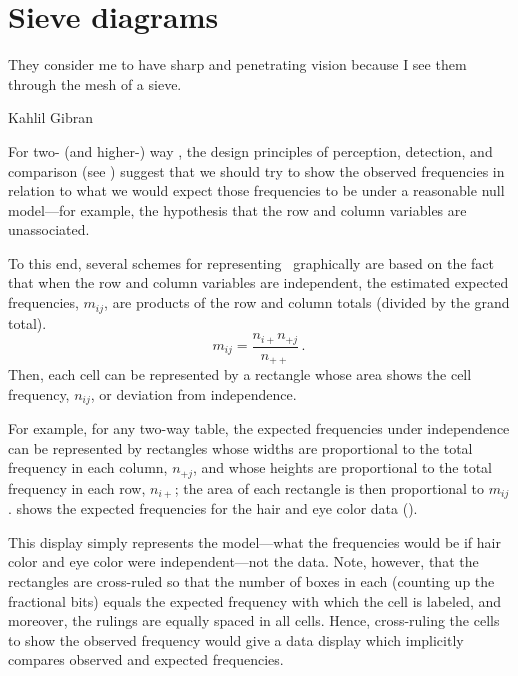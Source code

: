 \section{Sieve diagrams}\label{sec:twoway-sieve}
\epigraph{They consider me to have sharp and penetrating vision because I see
them through the mesh of a sieve.}{Kahlil Gibran}
For two- (and higher-) way \ctabs{}, the
design principles of perception, detection, and comparison
(see )
suggest that we should try to show the observed frequencies
in relation to what we would expect those frequencies to be
under a reasonable null model---for example, the
hypothesis that the row and column variables are unassociated.

To this end, several schemes for representing \ctabs\
graphically are
based on the fact that when the row and column variables are
independent, the estimated expected frequencies, \(m_{ij}\), are
products of the row and column totals (divided by the grand total).
\begin{equation*}
 m_{ij} = \frac{ n_{i+} n_{+j} } { n_{++} }
 \period
\end{equation*}
Then, each cell can be represented by a rectangle whose area shows
the cell frequency, \(n_{ij}\),  or deviation from independence.

For example, for any two-way table, the expected frequencies under independence
can be represented by rectangles whose widths are proportional to the
total frequency in each column, \(n_{+j}\), and whose heights are
proportional to the total frequency in each row, \(n_{i+}\); the area
of each rectangle is then proportional to \(m_{ij}\). 
shows the expected frequencies for the hair and eye color
data ().

This display simply represents the model---what the frequencies would
be if hair color and eye color were independent---not the data.
Note, however, that the rectangles are cross-ruled so that the number of
boxes in each (counting up the fractional bits) equals the expected
frequency with which the cell is labeled, and moreover, the
rulings are equally spaced in all cells.
Hence, cross-ruling the cells to show the observed frequency
would give a data display which implicitly compares observed
and expected frequencies.

